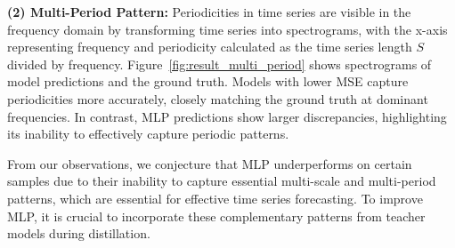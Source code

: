 \textbf{(2) Multi-Period Pattern:} Periodicities in time series are visible in the frequency domain by transforming time series into spectrograms, with the x-axis representing frequency and periodicity calculated as the time series length $S$ divided by frequency. 
Figure~\ref{fig:result_multi_period} shows spectrograms of model predictions and the ground truth. Models with lower MSE capture periodicities more accurately, closely matching the ground truth at dominant frequencies. In contrast, MLP predictions show larger discrepancies, highlighting its inability to effectively capture periodic patterns.



From our observations, we conjecture that MLP underperforms on certain samples due to their inability to capture essential multi-scale and multi-period patterns, which are essential for effective time series forecasting. To improve MLP, it is crucial to incorporate these complementary patterns from teacher models during distillation.
